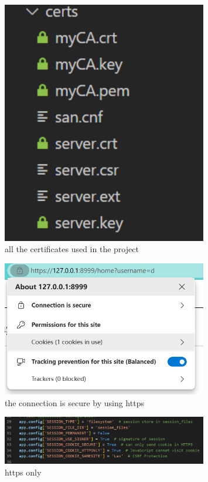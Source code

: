 \documentclass[12pt]{article}
\begin{document}
	\begin{figure}[H]
            \centering
            \includegraphics[width=0.8\textwidth]{zzrgraphs/certificates.png}
            \caption{all the certificates used in the project}
		\label{certificates}
        \end{figure}

	\begin{figure}[H]
            \centering
            \includegraphics[width=0.8\textwidth]{zzrgraphs/connection_is_secure.png}
            \caption{the connection is secure by using https}
		\label{secureconnection}
        \end{figure}

	\begin{figure}[H]
            \centering
            \includegraphics[width=0.8\textwidth]{zzrgraphs/cookie_secure_https_only.png}
            \caption{https only}
		\label{httpsonly}
        \end{figure}
\end{document}
